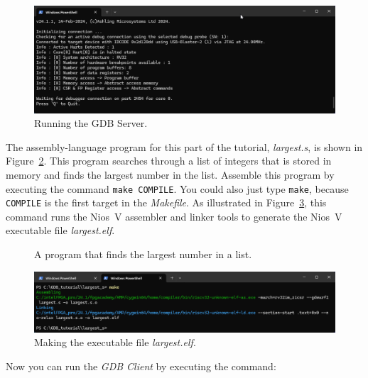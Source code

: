 \documentclass[11pt, twoside, pdftex]{article}
\begin{document}
{\begin{figure}[h]
    \begin{center}
        \includegraphics[scale=.55]{figures/server.png}
        \caption{Running the GDB Server.}
        \label{fig:server}
    \end{center}
\end{figure}

The assembly-language program for this part of the tutorial, {\it largest.s}, is shown in 
Figure~\ref{fig:largest_code}. This program searches through a list of integers that is 
stored in memory and finds the largest number in the list. Assemble this program by 
executing the command \texttt{make COMPILE}.
You could also just type \texttt{make}, because \texttt{COMPILE} is the first target in the 
{\it Makefile}. As illustrated in Figure~\ref{fig:make_largest}, this command runs the Nios~V
assembler and linker tools to generate the Nios~V executable file {\it largest.elf}.

\begin{figure}[H]

	\caption{A program that finds the largest number in a list.}
	\label{fig:largest_code}
\end{figure}

\begin{figure}[h]
    \begin{center}
        \includegraphics[scale=.55]{figures/make_largest.png}
        \caption{Making the executable file {\it largest.elf}.}
        \label{fig:make_largest}
    \end{center}
\end{figure}

Now you can run the {\it GDB Client} by executing the command:

}
\end{document}

